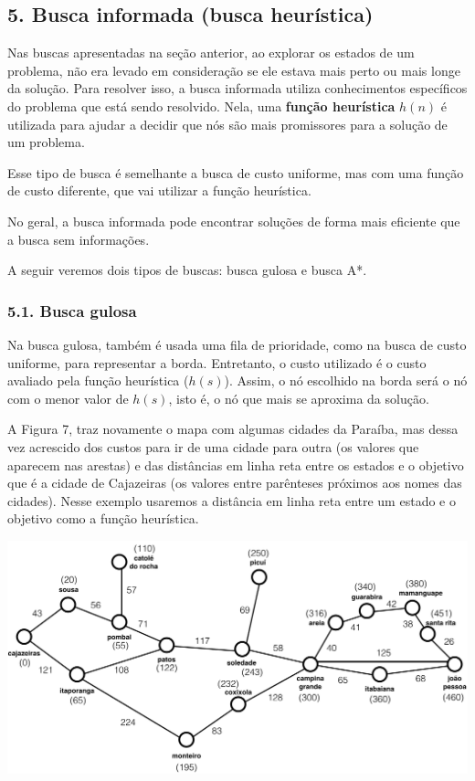 \documentclass[brazil,]{article}
\let\origfigure=\figure
\let\endorigfigure=\endfigure
\renewenvironment{figure}[1][]{%
\origfigure[H]
}{%
\endorigfigure
}
\begin{document}
\subsection{5. Busca informada (busca
heurística)}\label{busca-informada-busca-heuruxedstica}

Nas buscas apresentadas na seção anterior, ao explorar os estados de um
problema, não era levado em consideração se ele estava mais perto ou
mais longe da solução. Para resolver isso, a busca informada utiliza
conhecimentos específicos do problema que está sendo resolvido. Nela,
uma \textbf{função heurística} \(h(n)\) é utilizada para ajudar a
decidir que nós são mais promissores para a solução de um problema.

Esse tipo de busca é semelhante a busca de custo uniforme, mas com uma
função de custo diferente, que vai utilizar a função heurística.

No geral, a busca informada pode encontrar soluções de forma mais
eficiente que a busca sem informações.

A seguir veremos dois tipos de buscas: busca gulosa e busca A*.

\subsubsection{5.1. Busca gulosa}\label{busca-gulosa}

Na busca gulosa, também é usada uma fila de prioridade, como na busca de
custo uniforme, para representar a borda. Entretanto, o custo utilizado
é o custo avaliado pela função heurística (\(h(s)\)). Assim, o nó
escolhido na borda será o nó com o menor valor de \(h(s)\), isto é, o nó
que mais se aproxima da solução.

A Figura 7, traz novamente o mapa com algumas cidades da Paraíba, mas
dessa vez acrescido dos custos para ir de uma cidade para outra (os
valores que aparecem nas arestas) e das distâncias em linha reta entre
os estados e o objetivo que é a cidade de Cajazeiras (os valores entre
parênteses próximos aos nomes das cidades). Nesse exemplo usaremos a
distância em linha reta entre um estado e o objetivo como a função
heurística.

\begin{figure}
\centering
\includegraphics{pbmapa-custos-estimativa.png}
\caption{Mapa simplificado da Paraíba com custos entre as cidades e a
distância em linha reta entre cada cidade e Cajazeiras.}
\end{figure}
\end{document}
